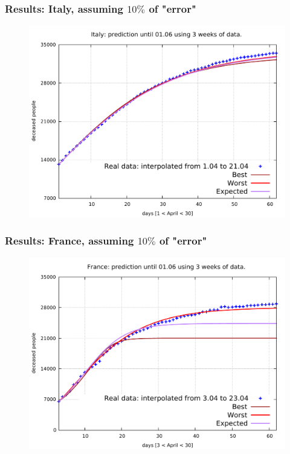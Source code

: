 \documentclass{beamer}
\begin{document}
\begin{frame}
	\frametitle{Results: Italy, assuming $10\%$ of "error"}
	\begin{figure}
\includegraphics[width=\linewidth]{../../err10p_simulations/it/1-21/1-21.pdf}
	\end{figure}
\end{frame}

\begin{frame}
	\frametitle{Results: France, assuming $10\%$ of "error"}
	\begin{figure}
\includegraphics[width=\linewidth]{../../err10p_simulations/fr/3-23/3-23.pdf}
	\end{figure}
\end{frame}
\end{document}
